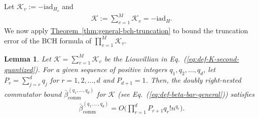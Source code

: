 \documentclass[11pt]{article}
\newtheorem{lemma}{Lemma}
\newcommand{\eq}[1]{(\ref{eq:#1})}
\newcommand{\thm}[1]{\hyperref[thm:#1]{Theorem~\ref*{thm:#1}}}
\renewcommand{\i}{\mathrm{i}}
\newcommand{\ad}{\mathrm{ad}}
\renewcommand{\comm}{\mathrm{comm}}
\newcommand{\mc}{\mathcal}
\begin{document}
Let $\mc{K}_v:=-\i \ad_{H_v}$ and \begin{align}
\label{eq:def-K-second-quantized}
    \mc{K}:= \sum_{v=1}^M  \mc K_v= -\i \ad_H. 
\end{align}
We now apply \thm{general-bch-truncation} to bound the truncation error of the BCH formula of $\prod_{v=1}^M\mc K_v$.
\begin{lemma}
    Let $\mc K = \sum_{v=1}^M \mc K_v$ be the Liouvillian in Eq.~\eq{def-K-second-quantized}. For a given sequence of positive integers $q_1, q_2, \ldots, q_d$, let $P_{r} = \sum_{j=r}^{d} q_j$ for $r=1, 2, \ldots, d$ and $P_{d+1}=1$. Then, the doubly right-nested commutator bound $\bar{\beta}_{\comm}^{(q_1, \ldots, q_{d})}$ for $\mc K$ (see Eq.~\eq{def-beta-bar-general}) satisfies
    \begin{align}
    \label{eq:double-comm-second-quantized}
        \bar{\beta}_{\comm}^{(q_1, \ldots, q_{d})}= O\bigg(\prod_{r=1}^{d}P_{r+1} q_r!n^{q_r}\bigg).
    \end{align}
\end{lemma}
\end{document}
